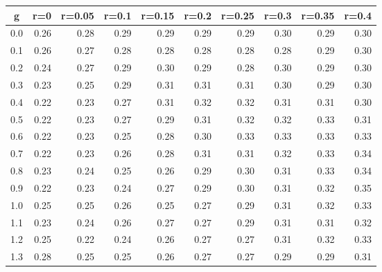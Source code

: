%
\begin{table}[!tbp]
 \begin{center}
 \begin{tabular}{rrrrrrrrrr}\hline\hline
\multicolumn{1}{c}{g}&\multicolumn{1}{c}{r=0}&\multicolumn{1}{c}{r=0.05}&\multicolumn{1}{c}{r=0.1}&\multicolumn{1}{c}{r=0.15}&\multicolumn{1}{c}{r=0.2}&\multicolumn{1}{c}{r=0.25}&\multicolumn{1}{c}{r=0.3}&\multicolumn{1}{c}{r=0.35}&\multicolumn{1}{c}{r=0.4}\tabularnewline
\hline
0.0&0.26&0.28&0.29&0.29&0.29&0.29&0.30&0.29&0.30\tabularnewline
0.1&0.26&0.27&0.28&0.28&0.28&0.28&0.28&0.29&0.30\tabularnewline
0.2&0.24&0.27&0.29&0.30&0.29&0.28&0.30&0.29&0.30\tabularnewline
0.3&0.23&0.25&0.29&0.31&0.31&0.31&0.30&0.29&0.30\tabularnewline
0.4&0.22&0.23&0.27&0.31&0.32&0.32&0.31&0.31&0.30\tabularnewline
0.5&0.22&0.23&0.27&0.29&0.31&0.32&0.32&0.33&0.31\tabularnewline
0.6&0.22&0.23&0.25&0.28&0.30&0.33&0.33&0.33&0.33\tabularnewline
0.7&0.22&0.23&0.26&0.28&0.31&0.31&0.32&0.33&0.34\tabularnewline
0.8&0.23&0.24&0.25&0.26&0.29&0.30&0.31&0.33&0.34\tabularnewline
0.9&0.22&0.23&0.24&0.27&0.29&0.30&0.31&0.32&0.35\tabularnewline
1.0&0.25&0.25&0.26&0.25&0.27&0.29&0.31&0.32&0.33\tabularnewline
1.1&0.23&0.24&0.26&0.27&0.27&0.29&0.31&0.31&0.32\tabularnewline
1.2&0.25&0.22&0.24&0.26&0.27&0.27&0.31&0.32&0.33\tabularnewline
1.3&0.28&0.25&0.25&0.26&0.27&0.27&0.29&0.29&0.31\tabularnewline
\hline
\end{tabular}

\end{center}

\end{table}

